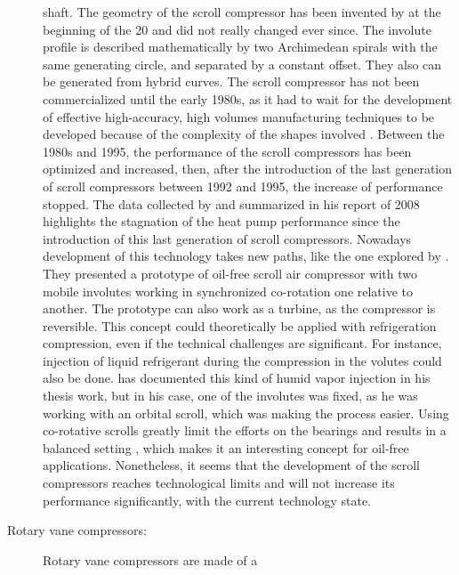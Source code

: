 \begin{description}
  shaft. The geometry of the scroll compressor has been invented by
  \citet{creux-1905a} at the beginning of the 20\th{} and did not
  really changed ever since. The involute profile is described
  mathematically by two Archimedean spirals with the same generating
  circle, and separated by a constant offset. They also can be
  generated from hybrid curves. The scroll compressor has not been
  commercialized until the early 1980s, as it had to wait for the
  development of effective high-accuracy, high volumes manufacturing
  techniques to be developed because of the complexity of the shapes
  involved \citep[p.\,16]{zogg-2008a}. Between the 1980s and 1995, the
  performance of the scroll compressors has been optimized and
  increased, then, after the introduction of the last generation of
  scroll compressors between 1992 and 1995, the increase of
  performance stopped. The data collected by
  \citet{Eschmann-2009a} and summarized in his
  report of 2008 highlights the stagnation of the heat pump
  performance since the introduction of this last generation of scroll
  compressors. Nowadays development of this technology takes new
  paths, like the one explored by \citet{Iglesias-favrat-2014a}. They
  presented a prototype of oil-free scroll air compressor with two
  mobile involutes working in synchronized co-rotation one relative to
  another. The prototype can also work as a turbine, as the compressor
  is reversible. This concept could theoretically be applied with
  refrigeration compression, even if the technical challenges are
  significant. For instance, injection of liquid refrigerant during
  the compression in the volutes could also be
  done. \citet{Zehnder-2004a} has documented this kind of humid vapor
  injection in his thesis work, but in his case, one of the involutes
  was fixed, as he was working with an orbital scroll, which was
  making the process easier. Using co-rotative scrolls greatly limit
  the efforts on the bearings and results in a balanced setting
  \citep[Fig.\,2 p.\,567]{Iglesias-favrat-2014a}, which makes it an
  interesting concept for oil-free applications. Nonetheless, it seems
  that the development of the scroll compressors reaches technological
  limits and will not increase its performance significantly, with
  the current technology state.
\item[Rotary vane compressors:]Rotary vane compressors are made of a

\end{description}

